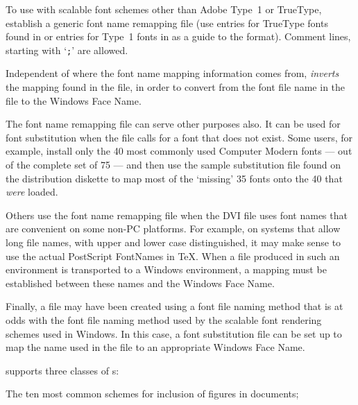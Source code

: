 To use {\DVIWindo} with scalable font schemes other than Adobe Type~1
or True\-Type, establish a generic font name remapping file
(use entries for True\-Type fonts found in {\WININI} or entries for
Type~1 fonts in {\ATMINI} as a guide to the format). 
Comment lines, starting with `{\tt ;}' are allowed.

Independent of where the font name mapping information comes from,
{\DVIWindo} {\it inverts\/} the mapping
found in the file, in order to convert from the font file name in the
{\DVI} file to the Windows Face Name.

The font name remapping file can serve other purposes also.
It can be used for font substitution when the {\DVI} file calls for a
font that does not exist. 
Some users, for example, install only the 40 most commonly used Computer
Modern fonts --- out of the complete set of 75 --- and then use the
sample substitution file  found on the {\DVIWindo}
distribution diskette to map most of the `missing' 35 fonts onto the 40
that {\it were\/} loaded. 

Others use the font name remapping file when the DVI file uses
font names that are convenient on some non-PC platforms.
For example, on systems that allow long file names, with upper and
lower case distinguished, it may make sense to use the actual
Post\-Script Font\-Names in {\TeX}.
When a file produced in such an environment is transported to a Windows
environment, a mapping must be established between these names and the
Windows Face Name.

Finally, a {\DVI} file may have been created using a font file naming
method that is at odds with the font file naming method used by the
scalable font rendering schemes used in Windows.  
In this case, a font substitution file can be set up to map the name
used in the {\DVI} file to an appropriate Windows Face Name.





{\DVIWindo} supports three classes of {\lavender\verb@\special@\revert}s: 

\beginbullets

\bpar The ten most common schemes for inclusion of figures in documents;

